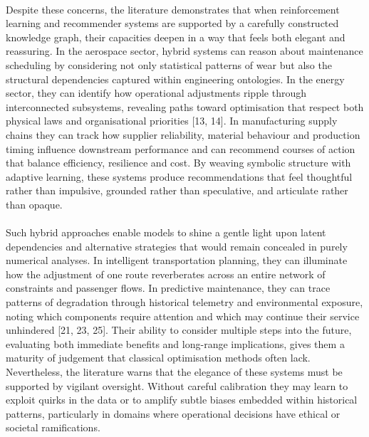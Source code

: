         \paragraph{}
        Despite these concerns, the literature demonstrates that when reinforcement learning and recommender systems are supported by a carefully constructed knowledge graph, their capacities deepen in a way that feels both elegant and reassuring. In the aerospace sector, hybrid systems can reason about maintenance scheduling by considering not only statistical patterns of wear but also the structural dependencies captured within engineering ontologies. In the energy sector, they can identify how operational adjustments ripple through interconnected subsystems, revealing paths toward optimisation that respect both physical laws and organisational priorities [13, 14]. In manufacturing supply chains they can track how supplier reliability, material behaviour and production timing influence downstream performance and can recommend courses of action that balance efficiency, resilience and cost. By weaving symbolic structure with adaptive learning, these systems produce recommendations that feel thoughtful rather than impulsive, grounded rather than speculative, and articulate rather than opaque.

        \paragraph{}
        Such hybrid approaches enable models to shine a gentle light upon latent dependencies and alternative strategies that would remain concealed in purely numerical analyses. In intelligent transportation planning, they can illuminate how the adjustment of one route reverberates across an entire network of constraints and passenger flows. In predictive maintenance, they can trace patterns of degradation through historical telemetry and environmental exposure, noting which components require attention and which may continue their service unhindered [21, 23, 25]. Their ability to consider multiple steps into the future, evaluating both immediate benefits and long-range implications, gives them a maturity of judgement that classical optimisation methods often lack. Nevertheless, the literature warns that the elegance of these systems must be supported by vigilant oversight. Without careful calibration they may learn to exploit quirks in the data or to amplify subtle biases embedded within historical patterns, particularly in domains where operational decisions have ethical or societal ramifications.

